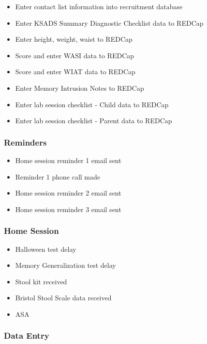\documentclass[]{book}
\providecommand{\tightlist}{%
  \setlength{\itemsep}{0pt}\setlength{\parskip}{0pt}}
\begin{document}
\begin{itemize}
\tightlist
\item
  Enter contact list information into recruitment database
\item
  Enter KSADS Summary Diagnostic Checklist data to REDCap
\item
  Enter height, weight, waist to REDCap
\item
  Score and enter WASI data to REDCap
\item
  Score and enter WIAT data to REDCap
\item
  Enter Memory Intrusion Notes to REDCap
\item
  Enter lab session checklist - Child data to REDCap
\item
  Enter lab session checklist - Parent data to REDCap
\end{itemize}

\hypertarget{reminders}{%
\subsubsection{Reminders}\label{reminders}}

\begin{itemize}
\tightlist
\item
  Home session reminder 1 email sent
\item
  Reminder 1 phone call made
\item
  Home session reminder 2 email sent
\item
  Home session reminder 3 email sent
\end{itemize}

\hypertarget{home-session}{%
\subsubsection{Home Session}\label{home-session}}

\begin{itemize}
\tightlist
\item
  Halloween test delay
\item
  Memory Generalization test delay
\item
  Stool kit received
\item
  Bristol Stool Scale data received
\item
  ASA
\end{itemize}

\hypertarget{data-entry-2}{%
\subsubsection{Data Entry}\label{data-entry-2}}
\end{document}
